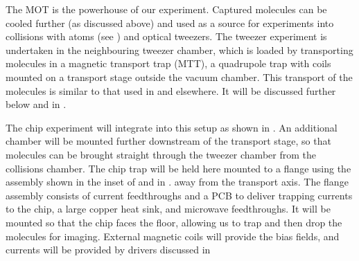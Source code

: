 The \CaF{} MOT is the powerhouse of our experiment. Captured molecules can be
cooled further (as discussed above) and used as a source for experiments into
collisions with \Rb{} atoms (see ) and optical tweezers. The tweezer
experiment is undertaken in the neighbouring tweezer chamber, which is loaded
by transporting molecules in a magnetic transport trap (MTT), a quadrupole trap
with coils mounted on a transport stage outside the vacuum chamber. This
transport of the molecules is similar to that used in
 and elsewhere. It will be
discussed further below and in .

The chip experiment will integrate into this setup as shown in
. An additional chamber will be mounted
further downstream of the transport stage, so that molecules can be brought
straight through the tweezer chamber from the collisions chamber. The chip trap
will be held here mounted to a flange using the assembly shown in the inset of
 and in
.
away from the transport axis. The flange assembly consists of current
feedthroughs and a PCB to deliver trapping currents to the chip, a large copper
heat sink, and microwave feedthroughs. It will be mounted so that the chip
faces the floor, allowing us to trap and then drop the molecules for imaging.
External magnetic coils will provide the bias fields, and currents will be
provided by drivers discussed in 

